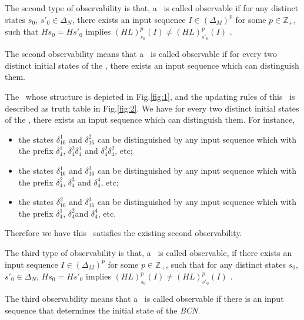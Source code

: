 \begin{definition}
	The second type of observability is that, a \BCN\ is called observable if for any distinct states $s_0$, ${s'}_0 \in \Delta_N$, there exists an input sequence $I\in(\Delta_M)^p$ for some $p\in \mathbb{Z}_+$, such that $Hs_0=H{s'}_0$ implies $(HL)^p_{s_0}(I)\neq (HL)^p_{{s'}_0}(I)$ \cite{Zhao2010Input}.
\end{definition}

The second observability means that a \BCN\ is called observable if for every two distinct initial states of the  \BCN, there exists an input sequence which can distinguish them. 
\begin{example}
The \BCN\ whose structure is depicted in Fig.\ref{fig:1}, and the updating rules of this \BCN\ is described as truth table in Fig.\ref{fig:2}.  We have for every two distinct initial states of the \BCN, there exists an input sequence which can distinguish them.  For instance,
\begin{itemize}
  \item the states $\delta_{16}^1$ and $\delta_{16}^2$ can be distinguished by any input sequence which with the prefix $\delta_{4}^1$, $\delta_{4}^2 \delta_{4}^1$ and $\delta_{4}^2 \delta_{4}^2$, etc;
  \item the states $\delta_{16}^1$ and $\delta_{16}^3$  can be distinguished by any input sequence which with the prefix $\delta_{4}^2$, $\delta_{4}^3$ and $\delta_{4}^4$, etc;
  \item the states $\delta_{16}^2$ and $\delta_{16}^3$  can be distinguished by any input sequence which with the prefix $\delta_{4}^1$, $\delta_{4}^2$and $\delta_{4}^4$, etc.
\end{itemize} 
Therefore we have this \BCN\ satisfies the existing second observability.
\end{example}   
\begin{definition}
	The third type of observability is that, a \BCN\ is called observable, if there exists an input sequence $I\in(\Delta_M)^p$ for some $p\in \mathbb{Z}_+$, such that for any distinct states $s_0$, ${s'}_0 \in \Delta_N$, $Hs_0=H{s'}_0$ implies $(HL)^p_{s_0}(I)\neq (HL)^p_{{s'}_0}(I)$ \cite{Cheng2011Identification}.
\end{definition}

The third observability means that a \BCN\ is called observable if there is an input sequence that determines the initial state of the {\em BCN}.

